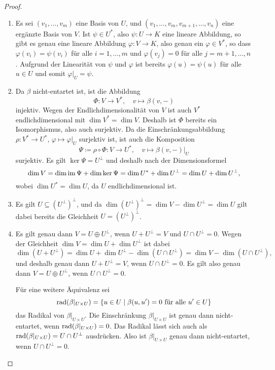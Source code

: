 \documentclass[a4paper,10pt,numbers=noenddot]{scrartcl}
\begin{document}
\begin{proof}
  \begin{enumerate}[leftmargin=*]
    \item
      Es sei $(v_1, \dotsc, v_m)$ eine Basis von $U$, und $(v_1, \dotsc, v_m, v_{m+1}, \dotsc, v_n)$ eine ergänzte Basis von $V$.
      Ist $\psi \in U^*$, also $\psi \colon U \to K$ eine lineare Abbildung, so gibt es genau eine lineare Abbildung $\varphi \colon V \to K$, also genau ein $\varphi \in V^*$, so dass $\varphi(v_i) = \psi(v_i)$ für alle $i = 1, \dotsc, m$ und $\varphi(v_j) = 0$ für alle $j = m+1, \dotsc, n$.
      Aufgrund der Linearität von $\psi$ und $\varphi$ ist bereits $\varphi(u) = \psi(u)$ für alle $u \in U$ und somit $\varphi|_U = \psi$.
    \item
      Da $\beta$ nicht-entartet ist, ist die Abbildung
      \[
        \Phi \colon V \to V^*,
        \quad
        v \mapsto \beta(v, -)
      \]
      injektiv.
      Wegen der Endlichdimensionalität von $V$ ist auch $V^*$ endlichdimensional mit $\dim V^* = \dim V$.
      Deshalb ist $\Phi$ bereits ein Isomorphismus, also auch surjektiv.
      Da die Einschränkungsabbildung $\rho \colon V^* \to U^*$, $\varphi \mapsto \varphi|_U$ surjektiv ist, ist auch die Komposition
      \[
        \Psi \coloneqq \rho \circ \Phi \colon V \to U^*,
        \quad
        v \mapsto \beta(v, -)|_U
      \]
      surjektiv.
      Es gilt $\ker \Psi = U^\perp$ und deshalb nach der Dimensionsformel
      \[
        \dim V
        = \dim \operatorname{im} \Psi + \dim \ker \Psi
        = \dim U^* + \dim U^\perp
        = \dim U + \dim U^\perp,
      \]
      wobei $\dim U^* = \dim U$, da $U$ endlichdimensional ist.
    \item
      Es gilt $U \subseteq (U^\perp)^\perp$, und da $\dim (U^\perp)^\perp = \dim V - \dim U^\perp = \dim U$ gilt dabei bereits die Gleichheit $U = (U^\perp)^\perp$.
    \item
      Es gilt genau dann $V = U \oplus U^\perp$, wenn $U + U^\perp = V$ und $U \cap U^\perp = 0$.
      Wegen der Gleichheit $\dim V = \dim U + \dim U^\perp$ ist dabei
      \[
          \dim( U + U^\perp )
        = \dim U + \dim U^\perp - \dim( U \cap U^\perp )
        = \dim V - \dim (U \cap U^\perp ),
      \]
      und deshalb genau dann $U + U^\perp = V$, wenn $U \cap U^\perp = 0$.
      Es gilt also genau dann $V = U \oplus U^\perp$, wenn $U \cap U^\perp = 0$.
      
      Für eine weitere Äquivalenz sei
      \[
          \operatorname{rad}(\beta|_{U \times U})
        = \{ u \in U \mid \text{$\beta(u, u') = 0$ für alle $u' \in U$} \}
      \]
      das Radikal von $\beta|_{U \times U}$.
      Die Einschränkung $\beta|_{U \times U}$ ist genau dann nicht-entartet, wenn $\operatorname{rad}(\beta|_{U \times U}) = 0$.
      Das Radikal lässt sich auch als $\operatorname{rad}(\beta|_{U \times U}) = U \cap U^\perp$ ausdrücken.
      Also ist $\beta|_{U \times U}$ genau dann nicht-entartet, wenn $U \cap U^\perp = 0$.
      

\end{enumerate}
\end{proof}
\end{document}
